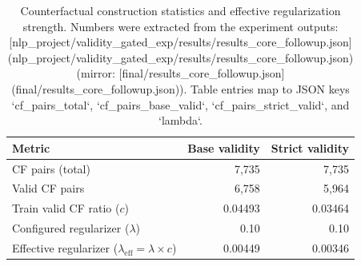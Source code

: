 \begin{table}[t]
\centering
\small
\begin{tabular}{lrr}
\hline
Metric & Base validity & Strict validity \\
\hline
CF pairs (total) & 7,735 & 7,735 \\
Valid CF pairs & 6,758 & 5,964 \\
Train valid CF ratio ($c$) & 0.04493 & 0.03464 \\
Configured regularizer ($\lambda$) & 0.10 & 0.10 \\
Effective regularizer ($\lambda_{\mathrm{eff}}=\lambda\times c$) & 0.00449 & 0.00346 \\
\hline
\end{tabular}
\caption{Counterfactual construction statistics and effective regularization strength. Numbers were extracted from the experiment outputs: [nlp_project/validity_gated_exp/results/results_core_followup.json](nlp_project/validity_gated_exp/results/results_core_followup.json) (mirror: [final/results_core_followup.json](final/results_core_followup.json)). Table entries map to JSON keys `cf_pairs_total`, `cf_pairs_base_valid`, `cf_pairs_strict_valid`, and `lambda`.}
\label{tab:cf_stats}
\end{table}
